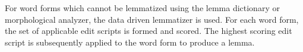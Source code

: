 For word forms which cannot be lemmatized using the lemma dictionary
or morphological analyzer, the data driven lemmatizer is used. For
each word form, the set of applicable edit scripts is formed and
scored. The highest scoring edit script is subsequently applied to the
word form to produce a lemma.

